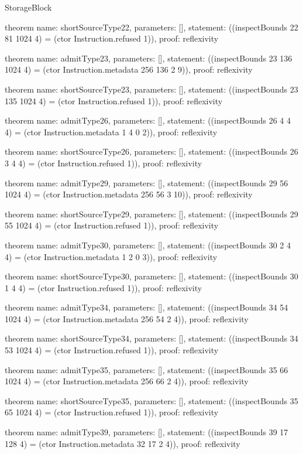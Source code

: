 \begin{lexlean}{StorageBlock}
\begin{semanticmodule}
theorem{
  name: shortSourceType22,
  parameters: [],
  statement: ((inspectBounds 22 81 1024 4) = (ctor Instruction.refused 1)),
  proof: reflexivity{}
}

theorem{
  name: admitType23,
  parameters: [],
  statement: ((inspectBounds 23 136 1024 4) = (ctor Instruction.metadata 256 136 2 9)),
  proof: reflexivity{}
}

theorem{
  name: shortSourceType23,
  parameters: [],
  statement: ((inspectBounds 23 135 1024 4) = (ctor Instruction.refused 1)),
  proof: reflexivity{}
}

theorem{
  name: admitType26,
  parameters: [],
  statement: ((inspectBounds 26 4 4 4) = (ctor Instruction.metadata 1 4 0 2)),
  proof: reflexivity{}
}

theorem{
  name: shortSourceType26,
  parameters: [],
  statement: ((inspectBounds 26 3 4 4) = (ctor Instruction.refused 1)),
  proof: reflexivity{}
}

theorem{
  name: admitType29,
  parameters: [],
  statement: ((inspectBounds 29 56 1024 4) = (ctor Instruction.metadata 256 56 3 10)),
  proof: reflexivity{}
}

theorem{
  name: shortSourceType29,
  parameters: [],
  statement: ((inspectBounds 29 55 1024 4) = (ctor Instruction.refused 1)),
  proof: reflexivity{}
}

theorem{
  name: admitType30,
  parameters: [],
  statement: ((inspectBounds 30 2 4 4) = (ctor Instruction.metadata 1 2 0 3)),
  proof: reflexivity{}
}

theorem{
  name: shortSourceType30,
  parameters: [],
  statement: ((inspectBounds 30 1 4 4) = (ctor Instruction.refused 1)),
  proof: reflexivity{}
}

theorem{
  name: admitType34,
  parameters: [],
  statement: ((inspectBounds 34 54 1024 4) = (ctor Instruction.metadata 256 54 2 4)),
  proof: reflexivity{}
}

theorem{
  name: shortSourceType34,
  parameters: [],
  statement: ((inspectBounds 34 53 1024 4) = (ctor Instruction.refused 1)),
  proof: reflexivity{}
}

theorem{
  name: admitType35,
  parameters: [],
  statement: ((inspectBounds 35 66 1024 4) = (ctor Instruction.metadata 256 66 2 4)),
  proof: reflexivity{}
}

theorem{
  name: shortSourceType35,
  parameters: [],
  statement: ((inspectBounds 35 65 1024 4) = (ctor Instruction.refused 1)),
  proof: reflexivity{}
}

theorem{
  name: admitType39,
  parameters: [],
  statement: ((inspectBounds 39 17 128 4) = (ctor Instruction.metadata 32 17 2 4)),
  proof: reflexivity{}
}


\end{semanticmodule}
\end{lexlean}
